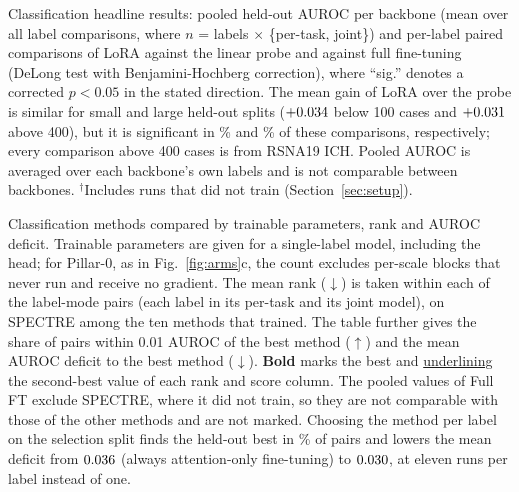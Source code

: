 \begin{table}[H]
\centering
\caption{Classification headline results: pooled held-out AUROC per backbone (mean over all label comparisons, where $n$ = labels $\times$ \{per-task, joint\}) and per-label paired comparisons of LoRA against the linear probe and against full fine-tuning (DeLong test with Benjamini-Hochberg correction), where ``sig.'' denotes a corrected $p<0.05$ in the stated direction. The mean gain of LoRA over the probe is similar for small and large held-out splits ($\numSigbysizeSmallMeandiff$ below 100 cases and $\numSigbysizeLargeMeandiff$ above 400), but it is significant in \numSigbysizeSmallSig\% and \numSigbysizeLargeSig\% of these comparisons, respectively; every comparison above 400 cases is from RSNA19 ICH. Pooled AUROC is averaged over each backbone's own labels and is not comparable between backbones. $^\dagger$Includes runs that did not train (Section~\ref{sec:setup}).}
\label{tab:headline}
\end{table}

\begin{table}[H]
\centering
\caption{Classification methods compared by trainable parameters, rank and AUROC deficit. Trainable parameters are given for a single-label model, including the head; for Pillar-0, as in Fig.~\ref{fig:arms}c, the count excludes per-scale blocks that never run and receive no gradient. The mean rank ($\downarrow$) is taken within each of the \numRankSlotsN{} label-mode pairs (each label in its per-task and its joint model), on SPECTRE among the ten methods that trained. The table further gives the share of pairs within 0.01 AUROC of the best method ($\uparrow$) and the mean AUROC deficit to the best method ($\downarrow$). \textbf{Bold} marks the best and \underline{underlining} the second-best value of each rank and score column. The pooled values of Full FT exclude SPECTRE, where it did not train, so they are not comparable with those of the other methods and are not marked. Choosing the method per label on the selection split finds the held-out best in \numSelectHit\% of pairs and lowers the mean deficit from $\numRegretAttnft$ (always attention-only fine-tuning) to $\numSelectRegret$, at eleven runs per label instead of one.}
\label{tab:methods}
\end{table}

